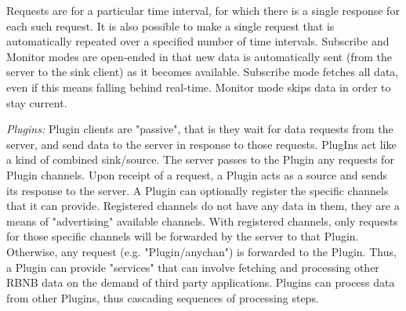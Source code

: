 Requests are for a particular time interval, for which there is a single response for each such request.  It is also possible to make a single request that is automatically repeated over a specified number of time intervals. Subscribe and Monitor modes are open-ended in that new data is automatically sent (from the server to the sink client) as it becomes available.  Subscribe mode fetches all data, even if this means falling behind real-time.  Monitor mode skips data in order to stay current.

\emph{Plugins:}
Plugin clients are "passive", that is they wait for data requests from the server, and send data to the server in response to those requests. PlugIns act like a kind of combined sink/source. The server passes to the Plugin any requests for Plugin channels.  Upon receipt of a request, a Plugin acts as a source and sends its response to the server.
A Plugin can optionally register the specific channels that it can provide. Registered channels do not have any data in them, they are a means of "advertising" available channels. With registered channels, only requests for those specific channels will be forwarded by the server to that Plugin. Otherwise, any request (e.g. "Plugin/anychan") is forwarded to the Plugin. Thus, a Plugin can provide "services" that can involve fetching and processing other RBNB data on the demand of third party applications.  Plugins can process data from other Plugins, thus cascading sequences of processing steps.
